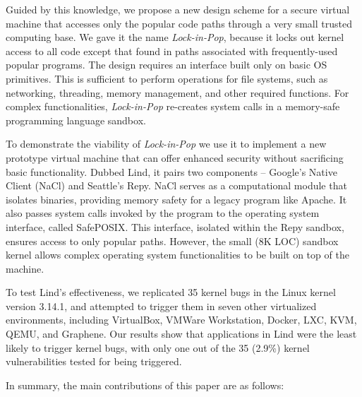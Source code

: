 Guided by this knowledge, we propose a new design scheme for a secure virtual machine that
accesses only the popular code paths through a very small trusted computing base.
We gave it the name \emph{Lock-in-Pop}, because it locks out kernel access to all code except
that found in paths associated with frequently-used popular programs. The design
requires an interface built only on basic OS primitives. This is sufficient to
perform operations for file systems, such as
networking, threading, memory management, and other required functions.
For complex functionalities,  \emph{Lock-in-Pop} re-creates system calls in
a memory-safe programming language sandbox.

To demonstrate the viability of \emph{Lock-in-Pop} we use it to implement a new
prototype virtual machine that can offer enhanced security without sacrificing
 basic functionality. Dubbed Lind, it pairs two components -- Google's Native Client
(NaCl) and Seattle's Repy. NaCl serves as a computational module that isolates
binaries, providing memory
safety for a legacy program like Apache. It also passes system calls invoked by
the program to the operating system interface, called SafePOSIX. This interface,
isolated within the Repy
sandbox, ensures access to only popular paths. However, the small (8K LOC) sandbox
kernel allows complex operating system functionalities to be built on top of the machine.

To test Lind's effectiveness, we replicated 35 kernel bugs in the Linux kernel
version 3.14.1,
and attempted to trigger them in seven other virtualized environments,
including VirtualBox, VMWare Workstation,
Docker, LXC, KVM, QEMU, and Graphene.
Our results show that applications in Lind were the least likely to trigger kernel bugs,
with only one out of the 35 (2.9\%) kernel vulnerabilities tested for being triggered.

In summary, the main contributions of this paper are as follows:

